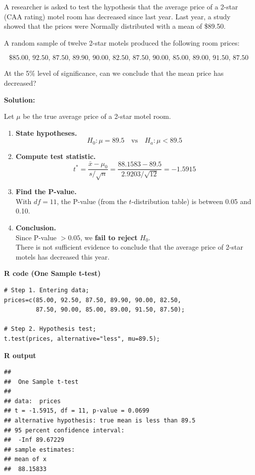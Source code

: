 \begin{example}

A researcher is asked to test the hypothesis that the average price of a 2-star (CAA rating) motel room has decreased since last year. Last year, a study showed that the prices were Normally distributed with a mean of \$89.50.

A random sample of twelve 2-star motels produced the following room prices:

\[
\text{\$85.00, 92.50, 87.50, 89.90, 90.00, 82.50, 87.50, 90.00, 85.00, 89.00, 91.50, 87.50}
\]

At the 5\% level of significance, can we conclude that the mean price has decreased?

\textbf{Solution:}

Let $\mu$ be the true average price of a 2-star motel room.

\begin{enumerate}
  \item \textbf{State hypotheses.}
  \[
  H_0 : \mu = 89.5 \quad \text{vs} \quad H_a : \mu < 89.5
  \]

  \item \textbf{Compute test statistic.}
  \[
  t^\ast = \frac{\bar{x} - \mu_0}{s / \sqrt{n}} = \frac{88.1583 - 89.5}{2.9203 / \sqrt{12}} = -1.5915
  \]

  \item \textbf{Find the P-value.} \\
  With $df = 11$, the P-value (from the $t$-distribution table) is between 0.05 and 0.10.

  \item \textbf{Conclusion.} \\
  Since P-value $> 0.05$, we \textbf{fail to reject} $H_0$. \\
  There is not sufficient evidence to conclude that the average price of 2-star motels has decreased this year.
\end{enumerate}
\vspace{1em}
\noindent\textbf{R code (One Sample t-test)}
\begin{tcolorbox}[colback=gray!10, colframe=black!45, arc=2mm]
\begin{verbatim}
# Step 1. Entering data;
prices=c(85.00, 92.50, 87.50, 89.90, 90.00, 82.50,
         87.50, 90.00, 85.00, 89.00, 91.50, 87.50);

# Step 2. Hypothesis test;
t.test(prices, alternative="less", mu=89.5);
\end{verbatim}
\end{tcolorbox}
\vspace{1em}
\noindent\textbf{R output}
\begin{tcolorbox}[colback=gray!10, colframe=black!45, arc=2mm]
\begin{verbatim}
## 
##  One Sample t-test
## 
## data:  prices
## t = -1.5915, df = 11, p-value = 0.0699
## alternative hypothesis: true mean is less than 89.5
## 95 percent confidence interval:
##  -Inf 89.67229
## sample estimates:
## mean of x 
##  88.15833 
\end{verbatim}
\end{tcolorbox}


\end{example}

